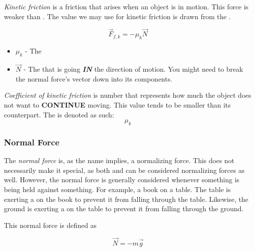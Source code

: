 \begin{definition}\label{def:Kinetic Friction}
  \emph{Kinetic friction} is a friction that arises when an object is in motion.
  This force is weaker than .
  The value we may use for kinetic friction is drawn from the .

  \begin{equation}\label{eq:Kinetic Friction}
    \vec{F}_{f,k} = -\mu_{k} \vec{N}
  \end{equation}
  \begin{itemize}[noitemsep, nolistsep]
    \item $\mu_{k}$ - The 
    \item $\vec{N}$ - The  that is going \textbf{\emph{IN}} the direction of motion. You might need to break the normal force's vector down into its components.
  \end{itemize}
\end{definition}

\begin{definition}\label{def:Coefficient of Kinetic Friction}
  \emph{Coefficient of kinetic friction} is  number that represents how much the object does not want to \textbf{CONTINUE} moving.
  This value tends to be smaller than its  counterpart.
  The  is denoted as such:
  \begin{equation}\label{eq:Coefficient of Kinetic Friction}
    \mu_{k}
  \end{equation}
\end{definition}

\subsubsection{Normal Force}\label{subsubsec:Normal Force}
\begin{definition}\label{def:Normal Force}
  The \emph{normal force} is, as the name implies, a normalizing force.
  This does not necessarily make it special, as both  and  can be considered normalizing forces as well.
  However, the normal force is generally considered whenever something is being held against something.
  For example, a book on a table.
  The table is exerting a  on the book to prevent it from falling through the table.
  Likewise, the ground is exerting a  on the table to prevent it from falling through the ground.

  This normal force is defined as

  \begin{equation}\label{eq:Normal Force}
    \vec{N} = -m \vec{g}
  \end{equation}
\end{definition}

